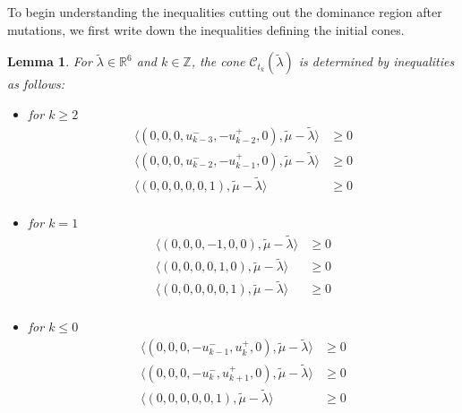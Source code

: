 \documentclass{amsart}
\newtheorem{lemma}[theorem]{Lemma}
\numberwithin{theorem}{section}
\newcommand{\cC}{\mathcal{C}}
\newcommand{\RR}{\mathbb{R}}
\newcommand{\ZZ}{\mathbb{Z}}
\begin{document}
  To begin understanding the inequalities cutting out the dominance region after mutations, we first write down the inequalities defining the initial cones.
  \begin{lemma}
    For $\tilde\lambda\in\RR^6$ and $k\in\ZZ$, the cone $\cC_{t_k}(\tilde\lambda)$ is determined by inequalities as follows:
    \begin{itemize}
      \item for $k\ge 2$
        \begin{align*}
          \langle (0,0,0,u_{k-3}^-,-u_{k-2}^+,0), \tilde\mu - \tilde\lambda\rangle &\ge 0\\ 
          \langle (0,0,0,u_{k-2}^-,-u_{k-1}^+,0), \tilde\mu - \tilde\lambda\rangle &\ge 0\\ 
          \langle (0,0,0,0,0,1), \tilde\mu - \tilde\lambda\rangle &\ge 0\\ 
        \end{align*}
      \item for $k=1$
        \begin{align*}
          \langle (0,0,0,-1,0,0), \tilde\mu - \tilde\lambda\rangle &\ge 0\\ 
          \langle (0,0,0,0,1,0), \tilde\mu - \tilde\lambda\rangle &\ge 0\\ 
          \langle (0,0,0,0,0,1), \tilde\mu - \tilde\lambda\rangle &\ge 0\\ 
        \end{align*}
      \item for $k\le 0$
        \begin{align*}
          \langle (0,0,0,-u_{k-1}^-,u_{k}^+,0), \tilde\mu - \tilde\lambda\rangle &\ge 0\\ 
          \langle (0,0,0,-u_{k}^-,u_{k+1}^+,0), \tilde\mu - \tilde\lambda\rangle &\ge 0\\ 
          \langle (0,0,0,0,0,1), \tilde\mu - \tilde\lambda\rangle &\ge 0\\ 
        \end{align*}
    \end{itemize}
  \end{lemma}
\end{document}
